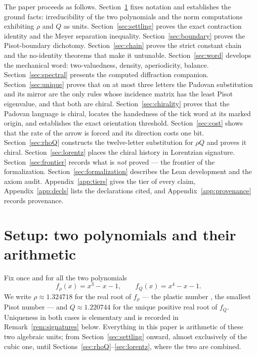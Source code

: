 \documentclass[11pt]{amsart}
\theoremstyle{plain}
\theoremstyle{definition}
\theoremstyle{remark}
\begin{document}
The paper proceeds as follows. Section~\ref{sec:setup} fixes notation and establishes the ground facts: irreducibility of the two polynomials and the norm computations exhibiting $\rho$ and $Q$ as units. Section~\ref{sec:settling} proves the exact contraction identity and the Meyer separation inequality. Section~\ref{sec:boundary} proves the Pisot-boundary dichotomy. Section~\ref{sec:chain} proves the strict constant chain and the no-identity theorems that make it untunable. Section~\ref{sec:word} develops the mechanical word: two-valuedness, density, aperiodicity, balance. Section~\ref{sec:spectral} presents the computed diffraction companion. Section~\ref{sec:unique} proves that on at most three letters the Padovan substitution and its mirror are the only rules whose incidence matrix has the least Pisot eigenvalue, and that both are chiral. Section~\ref{sec:chirality} proves that the Padovan language is chiral, locates the handedness of the tick word at its marked origin, and establishes the exact orientation threshold. Section~\ref{sec:cost} shows that the rate of the arrow is forced and its direction costs one bit. Section~\ref{sec:rhoQ} constructs the twelve-letter substitution for $\rho Q$ and proves it chiral. Section~\ref{sec:lorentz} places the chiral history in Lorentzian signature. Section~\ref{sec:frontier} records what is \emph{not} proved --- the frontier of the formalization. Section~\ref{sec:formalization} describes the Lean development and the axiom audit. Appendix~\ref{app:tiers} gives the tier of every claim, Appendix~\ref{app:decls} lists the declarations cited, and Appendix~\ref{app:provenance} records provenance.

\section{Setup: two polynomials and their arithmetic}\label{sec:setup}

Fix once and for all the two polynomials
\begin{equation}\label{eq:polys}
  f_{\rho}(x) = x^3 - x - 1, \qquad f_{Q}(x) = x^4 - x - 1 .
\end{equation}
We write $\rho \approx 1.324718$ for the real root of $f_{\rho}$ --- the plastic number \cite{aarts2001}, the smallest Pisot number \cite{siegel1944,bertin1992} --- and $Q \approx 1.220744$ for the unique positive real root of $f_{Q}$. Uniqueness in both cases is elementary and is recorded in Remark~\ref{rem:signatures} below. Everything in this paper is arithmetic of these two algebraic units; from Section~\ref{sec:settling} onward, almost exclusively of the cubic one, until Sections~\ref{sec:rhoQ}--\ref{sec:lorentz}, where the two are combined.
\end{document}
